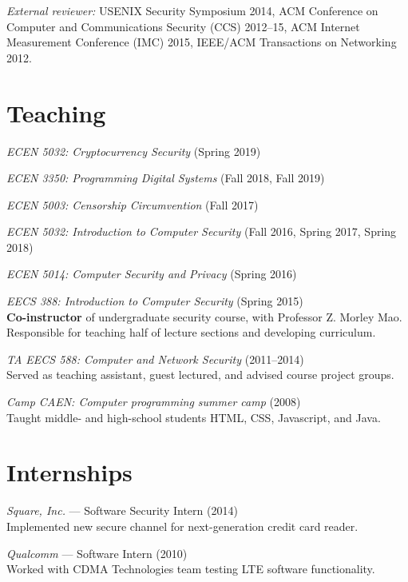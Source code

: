 \documentclass[margin,11pt]{res} %
\begin{document}
    \emph{External reviewer:}
    USENIX Security Symposium 2014,
    ACM Conference on Computer and Communications Security (CCS) 2012--15,
    ACM Internet Measurement Conference (IMC) 2015,
    IEEE/ACM Transactions on Networking 2012.

\vspace{6pt}
\section{\large Teaching}
    \emph{ECEN 5032: Cryptocurrency Security} (Spring 2019)

    \emph{ECEN 3350: Programming Digital Systems} (Fall 2018, Fall 2019)

    \emph{ECEN 5003: Censorship Circumvention} (Fall 2017)

    \emph{ECEN 5032: Introduction to Computer Security} (Fall 2016, Spring 2017, Spring 2018)

    \emph{ECEN 5014: Computer Security and Privacy} (Spring 2016)

    \emph{EECS 388: Introduction to Computer Security}  (Spring 2015)\\
    \textbf{Co-instructor} of undergraduate security course, with Professor Z. Morley Mao. Responsible for teaching half of lecture sections and developing curriculum.

    \emph{TA EECS 588: Computer and Network Security} (2011--2014)\\
    Served as teaching assistant, guest lectured, and advised course project groups.


    \emph{Camp CAEN: Computer programming summer camp}  (2008)\\
    Taught middle- and high-school students HTML, CSS, Javascript, and Java.


\vspace{6pt}
\section{\large Internships}

    \emph{Square, Inc.} --- Software Security Intern (2014) \\
    Implemented new secure channel for next-generation credit card reader.
    
    \emph{Qualcomm} --- Software Intern (2010) \\
    Worked with CDMA Technologies team testing LTE software functionality.
    
\end{document}

